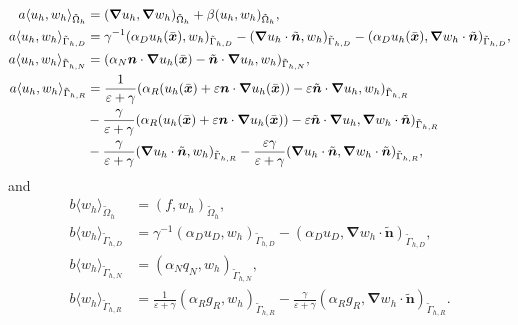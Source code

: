 \documentclass{article}
\begin{document}
\begin{subequations}\label{eq:unfitted_bilinear_form_final}
\begin{align}
    a\langle u_h,w_h \rangle_{\tilde{\Omega}_h} &= (\boldsymbol{\nabla} u_h, \boldsymbol{\nabla} w_h)_{\tilde{\Omega}_h} + \beta  ( u_h,  w_h)_{\tilde{\Omega}_h},  \\
    a\langle u_h,w_h \rangle_{\tilde{\Gamma}_{h,D}} &=  \gamma^{-1} (\alpha_D u_h(\bar{\boldsymbol{x}}),w_h)_{\tilde{\Gamma}_{h,D}} - (\boldsymbol{\nabla} u_h \cdot \tilde{\boldsymbol{n}},w_h)_{\tilde{\Gamma}_{h,D}} - ( \alpha_D u_h(\bar{\boldsymbol{x}}),\boldsymbol{\nabla} w_h \cdot \tilde{\boldsymbol{n}})_{\tilde{\Gamma}_{h,D}},  \\
    a \langle u_h,w_h \rangle_{\tilde{\Gamma}_{h,N}} &= (\alpha_N \boldsymbol{n} \cdot \boldsymbol{\nabla} u_h(\bar{\boldsymbol{x}}) - \tilde{\boldsymbol{n}}\cdot \boldsymbol{\nabla} u_h,w_h)_{\tilde{\Gamma}_{h,N}}, \\
    a \langle u_h,w_h \rangle_{\tilde{\Gamma}_{h,R}} &= \frac{1}{\varepsilon + \gamma} ( \alpha_R(u_h(\bar{\boldsymbol{x}}) +  \varepsilon \boldsymbol{n}\cdot \boldsymbol{\nabla} u_h(\bar{\boldsymbol{x}})) - \varepsilon \tilde{\boldsymbol{n}}\cdot \boldsymbol{\nabla} u_h,w_h)_{\tilde{\Gamma}_{h,R}} 
     \notag \\
    & - \frac{\gamma}{\varepsilon + \gamma} (\alpha_R(u_h(\bar{\boldsymbol{x}}) +  \varepsilon \boldsymbol{n}\cdot \boldsymbol{\nabla} u_h(\bar{\boldsymbol{x}})) - \varepsilon \tilde{\boldsymbol{n}}\cdot \boldsymbol{\nabla} u_h,\boldsymbol{\nabla} w_h \cdot \tilde{\boldsymbol{n}})_{\tilde{\Gamma}_{h,R}} \notag \\
    & - \frac{\gamma}{\varepsilon + \gamma} (\boldsymbol{\nabla} u_h \cdot \tilde{\boldsymbol{n}},w_h)_{\tilde{\Gamma}_{h,R}} - \frac{\varepsilon\gamma}{\varepsilon + \gamma} (\boldsymbol{\nabla} u_h \cdot \tilde{\boldsymbol{n}},\boldsymbol{\nabla} w_h \cdot \tilde{\boldsymbol{n}})_{\tilde{\Gamma}_{h,R}} ,   
\end{align}
\end{subequations}
and
\begin{subequations}\label{eq:unfitted_linear_form_final}
\begin{align} 
    b\langle w_h \rangle_{\tilde{\Omega}_h} &= (f,w_h)_{\tilde{\Omega}_h},  \\
    b\langle w_h \rangle_{\tilde{\Gamma}_{h,D}} &=  \gamma^{-1} (\alpha_D u_D,w_h)_{\tilde{\Gamma}_{h,D}} 
    -(\alpha_D u_D,\boldsymbol{\nabla} w_h \cdot \tilde{\boldsymbol{n}})_{\tilde{\Gamma}_{h,D}} ,  \\
    b \langle w_h \rangle_{\tilde{\Gamma}_{h,N}} &= (\alpha_Nq_N,w_h)_{\tilde{\Gamma}_{h,N}},  \\
    b\langle w_h \rangle_{\tilde{\Gamma}_{h,R}} &=  \frac{1}{\varepsilon + \gamma} (\alpha_R g_R,w_h)_{\tilde{\Gamma}_{h,R}} - \frac{\gamma}{\varepsilon + \gamma} (\alpha_R g_{R},\boldsymbol{\nabla} w_h \cdot \tilde{\boldsymbol{n}})_{\tilde{\Gamma}_{h,R}}.
\end{align}
\end{subequations}
\end{document}
